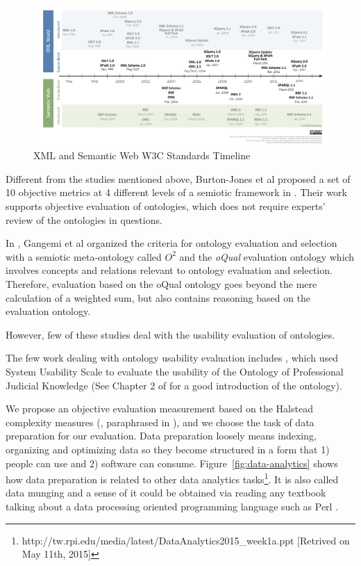\begin{figure}
	\centering
	\includegraphics[width=\linewidth]{XMLSemanticWebW3CTimeline}
	\caption[XML and Semantic Web W3C Standards Timeline]{XML and Semantic Web W3C Standards Timeline}
	\label{fig:timeline}
\end{figure}

Different from the studies mentioned above, Burton-Jones et al proposed a set of 10 objective metrics at 4 different levels of a semiotic framework in \cite{burton2005semiotic}. Their work supports objective evaluation of ontologies, which does not require experts' review of the ontologies in questions. 

In \cite{gangemi2006qood}, Gangemi et al organized the criteria for ontology evaluation and selection with a semiotic meta-ontology called $O^2$ and the \emph{oQual} evaluation ontology which involves concepts and relations relevant to ontology evaluation and selection. Therefore, evaluation based on the oQual ontology goes beyond the mere calculation of a weighted sum, but also contains reasoning based on the evaluation ontology.  

However, few of these studies deal with the usability evaluation of ontologies. 

The few work dealing with ontology usability evaluation includes \cite{casellas2009ontology}, which used System Usability Scale \cite{brooke1996sus} to evaluate the usability of the Ontology of Professional Judicial Knowledge (See Chapter 2 of \cite{casellas2009ontology} for a good introduction of the ontology).

We propose an objective evaluation measurement based on the Halstead complexity measures (\cite{halstead1977elements}, paraphrased in \cite{weyuker1988evaluating}), and we choose the task of data preparation for our evaluation. Data preparation loosely means indexing, organizing and optimizing data so they become structured in a form that 1) people can use and 2) software can consume. Figure~\ref{fig:data-analytics} shows how data preparation is related to other data analytics tasks\footnote{http://tw.rpi.edu/media/latest/DataAnalytics2015\_week1a.ppt [Retrived on May 11th, 2015]}. It is also called data munging and a sense of it could be obtained via reading any textbook talking about a data processing oriented programming language such as Perl \cite{cross2001data}.

